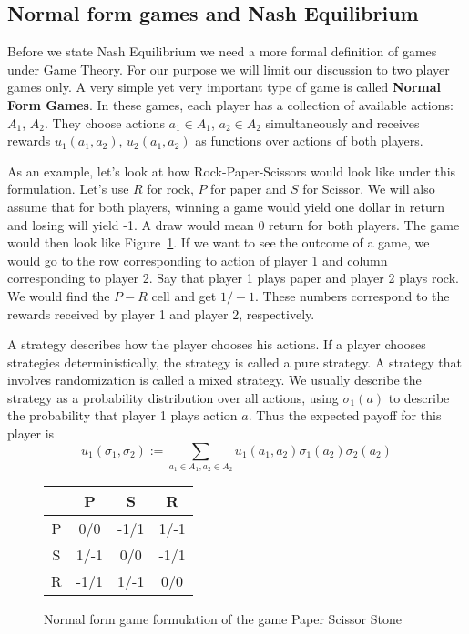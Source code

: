 \documentclass[10pt,a4paper]{article}
\begin{document}
\subsection{Normal form games and Nash Equilibrium}
Before we state Nash Equilibrium we need a more formal definition of games under Game Theory. For our purpose we will limit our discussion to two player games only. A very simple yet very important type of game is called \textbf{Normal Form Games}. In these games, each player has a collection of available actions: $A_1$, $A_2$. They choose actions $a_1 \in A_1$, $a_2 \in A_2$ simultaneously and receives rewards $u_1(a_1, a_2)$, $u_2(a_1, a_2)$ as functions over actions of both players. 

As an example, let's look at how Rock-Paper-Scissors would look like under this formulation. Let's use $R$ for rock, $P$ for paper and $S$ for Scissor. We will also assume that for both players, winning a game would yield one dollar in return and losing will yield -1. A draw would mean 0 return for both players. The game would then look like Figure~\ref{figure:RPS}. If we want to see the outcome of a game, we would go to the row corresponding to action of player 1 and column corresponding to player 2. Say that player 1 plays paper and player 2 plays rock. We would find the $P-R$ cell and get $1/-1$. These numbers correspond to the rewards received by player 1 and player 2, respectively. 

A strategy describes how the player chooses his actions. If a player chooses strategies deterministically, the strategy is called a pure strategy. A strategy that involves randomization is called a mixed strategy. We usually describe the strategy as a probability distribution over all actions, using $\sigma_1(a)$ to describe the probability that player 1 plays action $a$. Thus the expected payoff for this player is 
$$
u_1(\sigma_1, \sigma_2) := \sum_{a_1 \in A_1, a_2 \in A_2} u_1(a_1, a_2)\sigma_1(a_2)\sigma_2(a_2)
$$

\begin{figure}[ht]
\centering
\begin{tabular}{|c|c|c|c|}
\hline
  & P & S & R \\ \hline
P& 0/0 & -1/1 & 1/-1\\ \hline
S& 1/-1 & 0/0 & -1/1\\ \hline
R& -1/1 & 1/-1 & 0/0\\ \hline
\end{tabular}
\caption{Normal form game formulation of the game Paper Scissor Stone}
\label{figure:RPS}
\end{figure}
\end{document}
